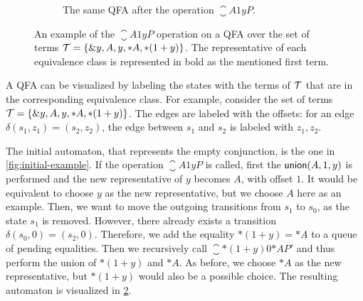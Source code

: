 \begin{figure}
\begin{subfigure}{0.5\textwidth}
\begin{centering}
\end{centering}

  \caption{The same QFA after the operation $\closure{A}{1}{y}{P}$.}\label{fig:closure-example}
\end{subfigure}

\caption[Visualization of the $\closure{A}{1}{y}{P}$ operation]{An example of the $\closure{A}{1}{y}{P}$ operation on a QFA over the set of terms
$\mathcal{T} = \{\&y, A, y, *A, *(1 + y)\}$.
The representative of each equivalence class is represented in bold as the mentioned first term.}


\end{figure}

\begin{example}
  A QFA can be visualized by labeling the states with the terms of $\mathcal{T}$ that are in the corresponding equivalence class.
  For example, consider the set of terms $\mathcal{T} = \{\&y, A, y, *A, *(1 + y)\}$.
  The edges are labeled with the offsets: for an edge $\delta(s_1, z_1) = (s_2, z_2)$, the edge between $s_1$ and $s_2$ is labeled with $z_1, z_2$.

  The initial automaton, that represents the empty conjunction, is the one in \cref{fig:initial-example}.
  If the operation $\closure{A}{1}{y}{P}$ is called,
  first the $\textsf{union}(A, 1, y)$ is performed and the new representative of $y$ becomes $A$, with offset $1$.
  It would be equivalent to choose $y$ as the new representative, but we choose $A$ here as an example.
  Then, we want to move the outgoing transitions from $s_1$ to $s_0$, as the state $s_1$ is removed.
  However, there already exists a transition $\delta(s_0,0) = (s_2, 0)$.
  Therefore, we add the equality $*(1 + y) = *A$ to a queue of pending equalities.
  Then we recursively call $\closure{*(1 + y)}{0}{*A}{P'}$ and thus perform the union of $*(1 + y)$ and $*A$.
  As before, we choose $*A$ as the new representative, but $*(1+y)$ would also be a possible choice.
  The resulting automaton is visualized in \cref{fig:closure-example}.
\end{example}

